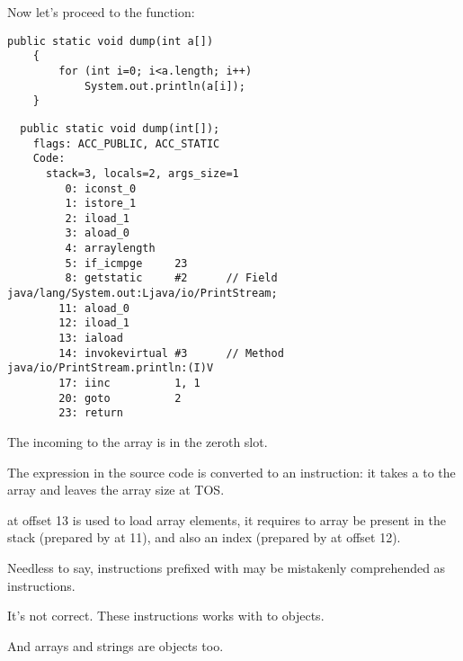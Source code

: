 Now let's proceed to the  function:

\begin{lstlisting}[style=customjava]
	public static void dump(int a[])
	{
		for (int i=0; i<a.length; i++)
			System.out.println(a[i]);
	}
\end{lstlisting}

\begin{lstlisting}
  public static void dump(int[]);
    flags: ACC_PUBLIC, ACC_STATIC
    Code:
      stack=3, locals=2, args_size=1
         0: iconst_0      
         1: istore_1      
         2: iload_1       
         3: aload_0       
         4: arraylength   
         5: if_icmpge     23
         8: getstatic     #2      // Field java/lang/System.out:Ljava/io/PrintStream;
        11: aload_0       
        12: iload_1       
        13: iaload        
        14: invokevirtual #3      // Method java/io/PrintStream.println:(I)V
        17: iinc          1, 1
        20: goto          2
        23: return        
\end{lstlisting}

The incoming  to the array is in the zeroth slot.

The  expression in the source code is converted to an  instruction: 
it takes a  to the array and leaves the array size at \ac{TOS}.

 at offset 13 is used to load array elements, 
it requires to array  be present
in the stack (prepared by  at 11), 
and also an index (prepared by  at offset 12).

Needless to say, instructions prefixed with  may be mistakenly comprehended 
as  instructions.

It's not correct.
These instructions works with  to objects.

And arrays and strings are objects too.

